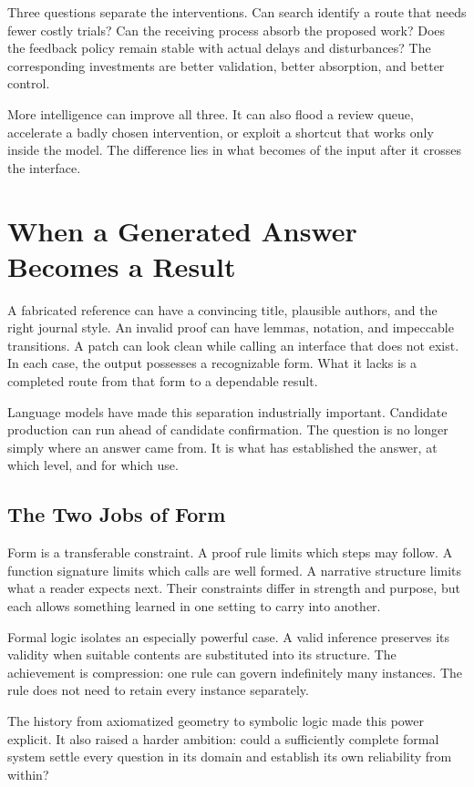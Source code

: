 \documentclass[11pt,openany]{book}
\begin{document}
Three questions separate the interventions. Can search identify a route that needs fewer costly trials? Can the receiving process absorb the proposed work? Does the feedback policy remain stable with actual delays and disturbances? The corresponding investments are better validation, better absorption, and better control.

More intelligence can improve all three. It can also flood a review queue, accelerate a badly chosen intervention, or exploit a shortcut that works only inside the model. The difference lies in what becomes of the input after it crosses the interface.

\section{When a Generated Answer Becomes a Result}

A fabricated reference can have a convincing title, plausible authors, and the right journal style. An invalid proof can have lemmas, notation, and impeccable transitions. A patch can look clean while calling an interface that does not exist. In each case, the output possesses a recognizable form. What it lacks is a completed route from that form to a dependable result.

Language models have made this separation industrially important. Candidate production can run ahead of candidate confirmation. The question is no longer simply where an answer came from. It is what has established the answer, at which level, and for which use.

\subsection{The Two Jobs of Form}

Form is a transferable constraint. A proof rule limits which steps may follow. A function signature limits which calls are well formed. A narrative structure limits what a reader expects next. Their constraints differ in strength and purpose, but each allows something learned in one setting to carry into another.

Formal logic isolates an especially powerful case. A valid inference preserves its validity when suitable contents are substituted into its structure. The achievement is compression: one rule can govern indefinitely many instances. The rule does not need to retain every instance separately.

The history from axiomatized geometry to symbolic logic made this power explicit. It also raised a harder ambition: could a sufficiently complete formal system settle every question in its domain and establish its own reliability from within?
\end{document}
